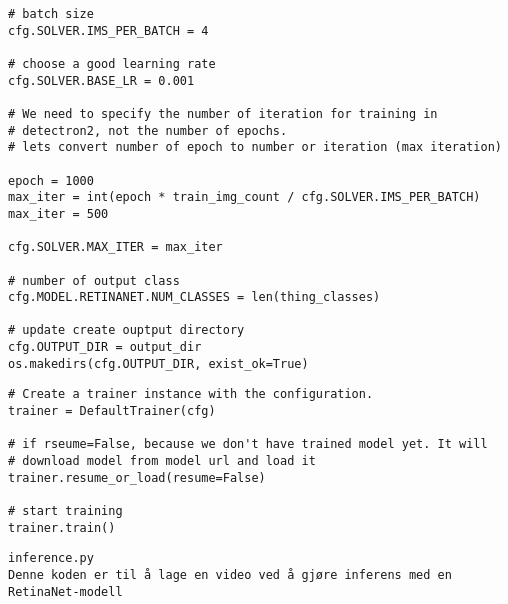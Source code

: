 \label{lst:train}
\begin{verbatim}
# batch size
cfg.SOLVER.IMS_PER_BATCH = 4

# choose a good learning rate
cfg.SOLVER.BASE_LR = 0.001

# We need to specify the number of iteration for training in
# detectron2, not the number of epochs.
# lets convert number of epoch to number or iteration (max iteration)

epoch = 1000
max_iter = int(epoch * train_img_count / cfg.SOLVER.IMS_PER_BATCH)
max_iter = 500

cfg.SOLVER.MAX_ITER = max_iter

# number of output class
cfg.MODEL.RETINANET.NUM_CLASSES = len(thing_classes)

# update create ouptput directory
cfg.OUTPUT_DIR = output_dir
os.makedirs(cfg.OUTPUT_DIR, exist_ok=True)
\end{verbatim}

\begin{verbatim}
# Create a trainer instance with the configuration.
trainer = DefaultTrainer(cfg) 

# if rseume=False, because we don't have trained model yet. It will
# download model from model url and load it
trainer.resume_or_load(resume=False)

# start training
trainer.train()
\end{verbatim}

\clearpage
\begin{verbatim}
inference.py
Denne koden er til å lage en video ved å gjøre inferens med en RetinaNet-modell
\end{verbatim}

